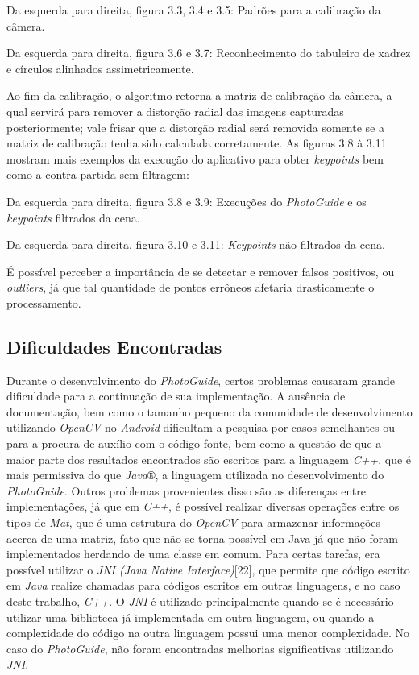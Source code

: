 Da esquerda para direita, figura 3.3, 3.4 e 3.5: Padrões para a calibração da câmera.


Da esquerda para direita, figura 3.6 e 3.7: Reconhecimento do tabuleiro de xadrez e círculos alinhados assimetricamente.

Ao fim da calibração, o algoritmo retorna a matriz de calibração da câmera, a qual servirá para remover a distorção radial das imagens capturadas posteriormente; vale frisar que a distorção radial será removida somente se  a matriz de calibração tenha sido calculada corretamente. As figuras 3.8 à 3.11 mostram mais exemplos da execução do aplicativo para obter \textit{keypoints} bem como a contra partida sem filtragem:


Da esquerda para direita, figura 3.8 e 3.9: Execuções do \textit{PhotoGuide} e os \textit{keypoints} filtrados da cena.


Da esquerda para direita, figura 3.10 e 3.11: \textit{Keypoints} não filtrados da cena.

É possível perceber a importância de se detectar e remover falsos positivos, ou \textit{outliers}, já que tal quantidade de pontos errôneos afetaria drasticamente o processamento.

\subsection{Dificuldades Encontradas}

Durante o desenvolvimento do \textit{PhotoGuide}, certos problemas causaram grande dificuldade para a continuação de sua implementação. A ausência de documentação, bem como o tamanho pequeno da comunidade de desenvolvimento utilizando \textit{OpenCV} no \textit{Android} dificultam a pesquisa por casos semelhantes ou para a procura de auxílio com o código fonte, bem como a questão de que a maior parte dos resultados encontrados são escritos para a linguagem \textit{C++}, que é mais permissiva do que \textit{Java}®, a linguagem utilizada no desenvolvimento do \textit{PhotoGuide}. Outros problemas provenientes disso são as diferenças entre implementações, já que em \textit{C++}, é possível realizar diversas operações entre os tipos de \textit{Mat},  que é uma estrutura do \textit{OpenCV} para armazenar informações acerca de uma matriz, fato que não se torna possível em Java já que não foram implementados herdando de uma classe em comum. Para certas tarefas, era possível utilizar o \textit{JNI (Java Native Interface)}[22], que permite que código escrito em \textit{Java }realize chamadas para códigos escritos em outras linguagens, e no caso deste trabalho, \textit{C++}. O \textit{JNI} é utilizado principalmente quando se é necessário utilizar uma biblioteca já implementada em outra linguagem, ou quando a complexidade do código na outra linguagem possui uma menor complexidade. No caso do \textit{PhotoGuide}, não foram encontradas melhorias significativas utilizando \textit{JNI}. 

